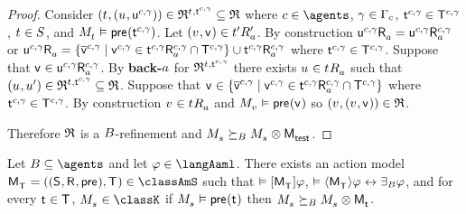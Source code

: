 \begin{proof}
Consider $(\kStateT, (\kStateU, \aStateU[\agentC, \gamma])) \in \refinement^{\kStateT, \aStateT[\agentC, \gamma]} \subseteq \refinement$ where $\agentC \in \agents$, $\gamma \in \Gamma_\agentC$, $\aStateT[\agentC, \gamma] \in \aStatesT[\agentC, \gamma]$, $\kStateT \in \kStates$, and $\kPModel{\kStateT} \entails \aPrecondition(\aStateT[\agentC, \gamma])$.
Let $(\kStateV, \aStateV) \in \kSuccessorsPA{\kStateTP}$.
By construction
$\aSuccessorsA{\aStateU[\agentC, \gamma]} = \aSuccessorsA[\agentC, \gamma]{\aStateU[\agentC, \gamma]}$ or 
$\aSuccessorsA{\aStateU[\agentC, \gamma]} = \{\aPStateV[\agentC, \gamma] \mid \aStateV[\agentC, \gamma] \in \aSuccessorsA[\agentC, \gamma]{\aStateT[\agentC, \gamma]} \cap \aStatesT[\agentC, \gamma]\} \cup \aSuccessorsA[\agentC, \gamma]{\aStateT[\agentC, \gamma]}$ where $\aStateT[\agentC, \gamma] \in \aStatesT[\agentC, \gamma]$.
Suppose that $\aStateV \in \aSuccessorsA[\agentC, \gamma]{\aStateU[\agentC, \gamma]}$.
By {\bf back-$\agentA$} for $\refinement^{\kStateT, \aStateT[\agentC, \gamma]}$ there exists $\kStateU \in \kSuccessorsA{\kStateT}$ such that $(\kStateU, \kStateUP) \in \refinement^{\kStateT, \aStateT[\agentC, \gamma]} \subseteq \refinement$.
Suppose that $\aStateV \in \{\aPStateV[\agentC, \gamma] \mid \aStateV[\agentC, \gamma] \in \aSuccessorsA[\agentC, \gamma]{\aStateT[\agentC, \gamma]} \cap \aStatesT[\agentC, \gamma]\}$ where $\aStateT[\agentC, \gamma] \in \aStatesT[\agentC, \gamma]$.
By construction $\kStateV \in \kSuccessorsA{\kStateT}$ and $\kPModel{\kStateV} \entails \aPrecondition(\aStateV)$ so $(\kStateV, (\kStateV, \aStateV)) \in \refinement$.

Therefore $\refinement$ is a $\agentsB$-refinement and $\kPModel{\kStateS} \simulatesBs \kPModel{\kStateS} \exec \aPModel{\aStateTest}$.

\end{proof}

\begin{theorem}\label{aaml-s5-synthesis}
Let $\agentsB \subseteq \agents$ and let $\phi \in \langAaml$.
There exists an action model $\aPModelAndTuple{\aStatesT} \in \classAmS$ such that 
$\entails \actionA{\aPModel{\aStatesT}} \phi$,
$\entails \actionE{\aPModel{\aStatesT}} \phi \iff \someactsBs \phi$, and
for every $\aStateT \in \aStatesT$, $\kPModel{\kStateS} \in \classK$ if $\kPModel{\kStateS} \entails \aPrecondition(\aStateT)$ then $\kPModel{\kStateS} \simulatesBs \kPModel{\kStateS} \exec \aPModel{\aStateT}$.
\end{theorem}

